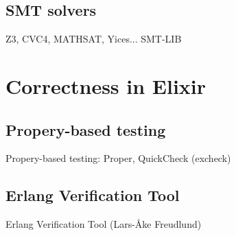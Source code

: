 \subsection{SMT solvers}

Z3, CVC4, MATHSAT, Yices... SMT-LIB

\section{Correctness in Elixir}

\subsection{Propery-based testing}

Propery-based testing: Proper, QuickCheck (excheck)

\subsection{Erlang Verification Tool}

Erlang Verification Tool (Lars-Åke Freudlund)
